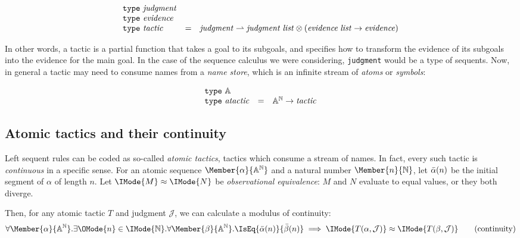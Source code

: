 \[
  \begin{array}{lcl}
    \mathtt{type}\ \mathit{judgment}\\
    \mathtt{type}\ \mathit{evidence}\\
    \mathtt{type}\ \mathit{tactic} &= &\mathit{judgment}\rightharpoonup \mathit{judgment}\;\mathit{list} \otimes (\mathit{evidence}\;\mathit{list}\to\mathit{evidence})
  \end{array}
\]

In other words, a tactic is a partial function that takes a goal to its
subgoals, and specifies how to transform the evidence of its subgoals into the
evidence for the main goal. In the case of the sequence calculus we were
considering, \verb!judgment! would be a type of sequents.  Now, in general a
tactic may need to consume names from a \emph{name store}, which is an infinite
stream of \emph{atoms} or \emph{symbols}:

\[
  \begin{array}{lcl}
    \mathtt{type}\ \mathbb{A}\\
    \mathtt{type}\ \mathit{atactic} &= &{\mathbb{A}}^{\mathbb{N}} \to \mathit{tactic}
  \end{array}
\]

\newcommand\KleeneEq[2]{\IMode{#1}\approx \IMode{#2}}
\newcommand\ModC[2]{\mathsf{M}(#1,#2)}

\subsection{Atomic tactics and their continuity}

Left sequent rules can be coded as so-called \emph{atomic tactics}, tactics
which consume a stream of names. In fact, every such tactic is
\emph{continuous} in a specific sense. For an atomic sequence
$\Member{\alpha}{\MLStream{\MLAtom}}$ and a natural number
$\Member{n}{\MLNat}$, let $\bar{\alpha}(n)$ be the initial segment of
$\alpha$ of length $n$. Let $\KleeneEq{M}{N}$ be \emph{observational
equivalence}: $M$ and $N$ evaluate to equal values, or they both diverge.

Then, for any atomic tactic $T$ and judgment $\mathcal{J}$, we can calculate a
modulus of continuity:
\begin{equation}
  \forall \Member{\alpha}{\MLStream{\MLAtom}}.
  \exists \OMode{n}\in\IMode{\MLNat}.
  \forall \Member{\beta}{\MLStream{\MLAtom}}.
    \IsEq{\bar{\alpha}(n)}{\bar{\beta}(n)}\implies \KleeneEq{T(\alpha,\mathcal{J})}{T(\beta,\mathcal{J})}
  \tag{continuity}
\end{equation}

